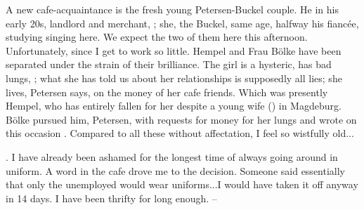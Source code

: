 A new cafe-acquaintance is the fresh young Petersen-Buckel couple. He in his early 20s, landlord and merchant, ; she, the Buckel, same age, halfway his fiancée, studying singing here. We expect the two of them here this afternoon. Unfortunately, since I get to work so little. Hempel and Frau Bölke have been separated under the strain of their brilliance. The girl is a hysteric, has bad lungs, ; what she has told us about her relationships is supposedly all lies; she lives, Petersen says, on the money of her cafe friends. Which was presently Hempel, who has entirely fallen for her despite a young wife () in Magdeburg. Bölke pursued him, Petersen, with requests for money for her lungs and wrote on this occasion . Compared to all these  without affectation, I feel so wistfully old...

\missing

. I have already been ashamed for the longest time of always going around in uniform. A word in the cafe drove me to the decision. Someone said essentially that only the unemployed would wear uniforms...I would have taken it off anyway in 14 days. I have been thrifty for long enough. --


